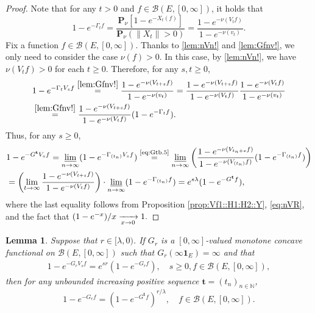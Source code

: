 \documentclass[12pt,a4paper]{amsart}
\numberwithin{equation}{section}
\theoremstyle{plain}
\newtheorem{lem}[thm]{Lemma}
\theoremstyle{definition}
\theoremstyle{remark}
\begin{document}
\begin{proof}
Note that for any $t>0$ and $f\in \mathcal B(E,[0,\infty])$, it holds that
\begin{equation}\label{lem:Gfnv!}
	1 - e^{- \Gamma_t f}
	= \frac{ \mathbf P_\nu [ 1 - e^{- X_t(f)}]}{ \mathbf P_\nu (\|X_t\| > 0)}
	= \frac{ 1 - e^{- \nu(V_tf)} }{ 1 - e^{- \nu(v_t)}}.
\end{equation}
Fix a function $f\in \mathcal B(E,[0,\infty])$.
Thanks to \eqref{lem:nVn!} and \eqref{lem:Gfnv!}, we only need to consider the case $\nu(f) > 0$.
	In this case, by \eqref{lem:nVn!}, we have $\nu(V_tf)>0$ for each $t\geq 0$.
	Therefore, for any $s,t\geq 0$,
	\begin{align}
	& 1 - e^{- \Gamma_t V_s f}
	\overset{\eqref{lem:Gfnv!}}= \frac{ 1 - e^{- \nu(V_{t+s} f)} }{ 1 - e^{- \nu(v_t)}}
	= \frac{ 1 - e^{- \nu(V_{t+s} f)} }{ 1 - e^{- \nu(V_tf)}} \frac{ 1 - e^{ - \nu(V_tf)}}{ 1 - e^{- \nu(v_t)}}
	\\ &  \label{eq:Gtb.5}\overset{\eqref{lem:Gfnv!}}= \frac{ 1 - e^{- \nu(V_{t+s} f)} }{ 1 - e^{- \nu(V_tf)}} ( 1 - e^{- \Gamma_t f}).
	\end{align}
	Thus, for any $s\geq 0$,
	\begin{align}
	& 1 - e^{- G^{\mathbf t} V_s f}
	= \varliminf_{n\to \infty} ( 1 - e^{- \Gamma_{(t_n)} V_s f})
	\overset{\text{\eqref{eq:Gtb.5}}}= \varliminf_{n\to \infty} \left( \frac{ 1 - e^{- \nu(V_{t_n+s}f)}}{ 1 - e^{- \nu(V_{(t_n)}f)}} (1 - e^{- \Gamma_{(t_n)} f}) \right)
	\\& = \left( \lim_{t \to \infty} \frac{ 1 - e^{- \nu(V_{t+s}f)}}{ 1 - e^{- \nu(V_{t}f)}} \right) \cdot \varliminf_{n\to \infty} (1 - e^{- \Gamma_{(t_n)} f} )
	= e^{s\lambda} (1 - e^{- G^{\mathbf t}f}),
	\end{align}
	where the last equality follows from Proposition \ref{prop:Vf1::H1:H2::Y}, \eqref{eq:nVR}, and the fact that
	$
	(1-e^{-x}) /x \xrightarrow[x\to 0]{} 1.
	\qedhere
	$
\end{proof}

\begin{lem} \label{prop:G*:H1:H2:H3:H4}
	Suppose that $r \in [\lambda,0)$.
	If $G_r$ is a $[0,\infty]$-valued monotone concave functional on $\mathcal B(E,[0,\infty])$ 
	such that $G_r(\infty \mathbf 1_E) = \infty$ and that
	\begin{align}
	1 - e^{-G_r V_s f}
	= e^{s r} (1 - e^{- G_r f}),
	\quad s\geq 0, f\in \mathcal B(E,[0,\infty]),
	\end{align}
	then for any unbounded increasing positive sequence $\mathbf t = (t_n)_{n\in \mathbb N}$,
\begin{equation}
	1 - e^{-G_r f} = (1 - e^{- G^\mathbf t f})^{r/\lambda}, \quad f \in \mathcal B(E,[0,\infty]).
\end{equation}
\end{lem}
\end{document}
